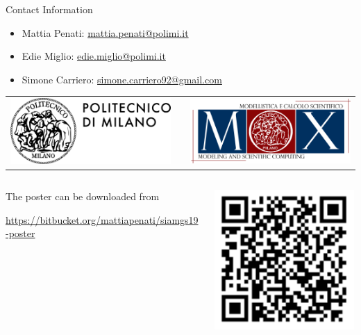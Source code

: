 \documentclass[final]{beamer}
\newlength{\onecolwid}
\begin{document}
\begin{frame}[t]
\begin{columns}[t]
\begin{column}{\onecolwid}
\begin{alertblock}{Contact Information}
\begin{itemize}
    \item Mattia Penati: \href{mailto:mattia.penati@polimi.it}{mattia.penati@polimi.it}
    \item Edie Miglio: \href{mailto:edie.miglio@polimi.it}{edie.miglio@polimi.it}
    \item Simone Carriero: \href{mailto:simone.carriero92@gmail.com}{simone.carriero92@gmail.com}
\end{itemize}
\begin{center}
    \begin{tabular}{ccc}
        \includegraphics[width=0.4\linewidth]{images/logopoli} %
        & \hfill & %
        \includegraphics[width=0.4\linewidth]{images/logomox}
    \end{tabular}
\end{center}
\hrulefill
\begin{columns}[onlytextwidth]
\begin{column}{0.83\textwidth}
    The poster can be downloaded from
    \begin{center}
        \footnotesize
        \url{https://bitbucket.org/mattiapenati/siamgs19-poster}
    \end{center}
\end{column}
\begin{column}{0.17\textwidth}
    \includegraphics[width=0.99\textwidth]{images/qr}

\end{column}
\end{columns}
\end{alertblock}
\end{column}
\end{columns}
\end{frame}
\end{document}
